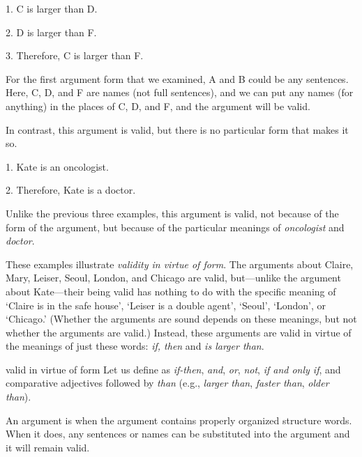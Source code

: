 	\noindent\begin{minipage}{0.99\textwidth}
	\begin{earg}
		\item[1.] C is larger than D.
		\item[2.] D is larger than F.
		\item[3.] Therefore, C is larger than F. 
	\end{earg}
	\end{minipage}

\noindent For the first argument form that we examined, A and B could be any sentences. Here, C, D, and F are names (not full sentences), and we can put any names (for anything) in the places of C, D, and F, and the argument will be valid.

In contrast, this argument is valid, but there is no particular form that makes it so.
	\begin{earg}
		\item[1.] Kate is an oncologist.
		\item[2.] Therefore, Kate is a doctor.
	\end{earg}
Unlike the previous three examples, this argument is valid, not because of the form of the argument, but because of the particular meanings of \textit{oncologist} and \textit{doctor}. 

These examples illustrate \emph{validity in virtue of form}. The arguments about Claire, Mary, Leiser, Seoul, London, and Chicago are valid, but---unlike the argument about Kate---their being valid has nothing to do with the specific meaning of `Claire is in the safe house', `Leiser is a double agent', `Seoul', `London', or `Chicago.' (Whether the arguments are sound depends on these meanings, but not whether the arguments are valid.) Instead, these arguments are valid in virtue of the meanings of just these words: \textit{if, then} and \textit{is larger than}.

\begin{factboxy}{valid in virtue of form}
Let us define  as \textit{if-then}, \textit{and}, \textit{or}, \textit{not}, \textit{if and only if}, and comparative adjectives followed by \textit{than} (e.g., \textit{larger than}, \textit{faster than}, \textit{older than}).

An argument is  when the argument contains properly organized structure words. When it does, any sentences or names can be substituted into the argument and it will remain valid. 
\end{factboxy}

